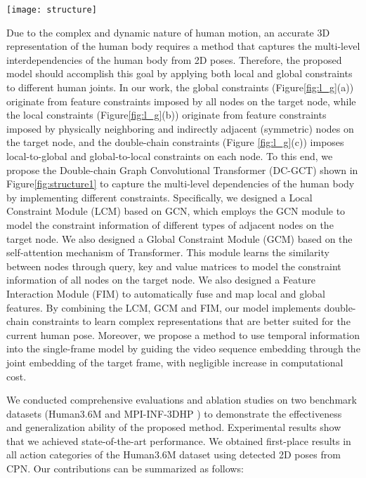 \documentclass[journal]{IEEEtran}
\begin{document}
\begin{figure*}[!t]
  \centering
  \texttt{[image: structure]}
  \caption{Overview of the proposed Double-chain Graph Convolution Transformer (DC-GCT). The DC-GCT consists of $M$ stacked double-chain structures, where each structure splits the channel dimension $C$ into $C_1$ and $C_2$, and applies local-to-global and global-to-local constraints to capture the dependencies of human pose, respectively.}
\label{fig:structure1}
\end{figure*}


Due to the complex and dynamic nature of human motion, an accurate 3D representation of the human body requires a method that captures the multi-level interdependencies of the human body from 2D poses. Therefore, the proposed model should accomplish this goal by applying both local and global constraints to different human joints. In our work,  the global constraints (Figure\ref{fig:l_g}(a)) originate from feature constraints imposed by all nodes on the target node, while the local constraints (Figure\ref{fig:l_g}(b)) originate from feature constraints imposed by physically neighboring and indirectly adjacent (symmetric) nodes on the target node, and the double-chain constraints (Figure \ref{fig:l_g}(c)) imposes local-to-global and global-to-local constraints on each node. To this end, we propose the Double-chain Graph Convolutional Transformer (DC-GCT) shown in Figure\ref{fig:structure1} to capture the multi-level dependencies of the human body by implementing different constraints. Specifically, we designed a Local Constraint Module (LCM) based on GCN, which employs the GCN module to model the constraint information of different types of adjacent nodes on the target node. We also designed a Global Constraint Module (GCM) based on the self-attention mechanism of Transformer. This module learns the similarity between nodes through query, key and value matrices to model the constraint information of all nodes on the target node. We also designed a Feature Interaction Module (FIM) to automatically fuse and map local and global features. By combining the LCM, GCM and FIM, our model implements double-chain constraints to learn complex representations that are better suited for the current human pose. Moreover, we propose a method to use temporal information into the single-frame model by guiding the video sequence embedding through the joint embedding of the target frame, with negligible increase in computational cost.


We conducted comprehensive evaluations and ablation studies on two benchmark datasets (Human3.6M \cite{ionescu2013human3} and MPI-INF-3DHP \cite{mehta2017monocular}) to demonstrate the effectiveness and generalization ability of the proposed method. Experimental results show that we achieved state-of-the-art performance. We obtained first-place results in all action categories of the Human3.6M dataset using detected 2D poses from CPN. Our contributions can be summarized as follows:
\end{document}
